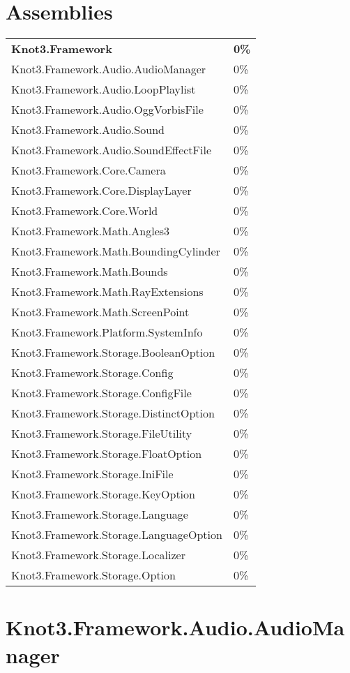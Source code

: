 \documentclass[a4paper,10pt]{article}
\begin{document}
\section{Assemblies}
\begin{longtable}[l]{ll}
\textbf{Knot3.Framework} & \textbf{0\%}\\
Knot3.Framework.Audio.AudioManager & 0\%\\
Knot3.Framework.Audio.LoopPlaylist & 0\%\\
Knot3.Framework.Audio.OggVorbisFile & 0\%\\
Knot3.Framework.Audio.Sound & 0\%\\
Knot3.Framework.Audio.SoundEffectFile & 0\%\\
Knot3.Framework.Core.Camera & 0\%\\
Knot3.Framework.Core.DisplayLayer & 0\%\\
Knot3.Framework.Core.World & 0\%\\
Knot3.Framework.Math.Angles3 & 0\%\\
Knot3.Framework.Math.BoundingCylinder & 0\%\\
Knot3.Framework.Math.Bounds & 0\%\\
Knot3.Framework.Math.RayExtensions & 0\%\\
Knot3.Framework.Math.ScreenPoint & 0\%\\
Knot3.Framework.Platform.SystemInfo & 0\%\\
Knot3.Framework.Storage.BooleanOption & 0\%\\
Knot3.Framework.Storage.Config & 0\%\\
Knot3.Framework.Storage.ConfigFile & 0\%\\
Knot3.Framework.Storage.DistinctOption & 0\%\\
Knot3.Framework.Storage.FileUtility & 0\%\\
Knot3.Framework.Storage.FloatOption & 0\%\\
Knot3.Framework.Storage.IniFile & 0\%\\
Knot3.Framework.Storage.KeyOption & 0\%\\
Knot3.Framework.Storage.Language & 0\%\\
Knot3.Framework.Storage.LanguageOption & 0\%\\
Knot3.Framework.Storage.Localizer & 0\%\\
Knot3.Framework.Storage.Option & 0\%\\
\end{longtable}
\newpage
\section{Knot3.Framework.Audio.AudioManager}
\end{document}
